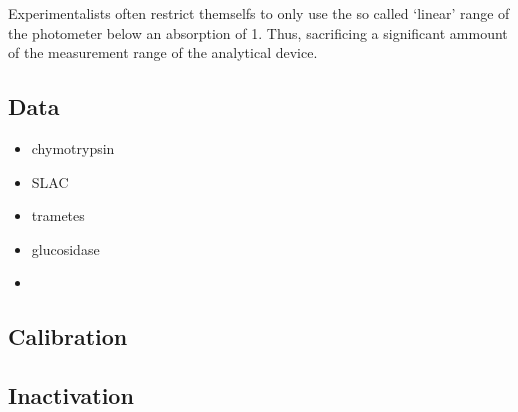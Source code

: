 \documentclass[letterpaper,10pt,english]{jupyterBook}
\begin{document}
\sphinxAtStartPar
Experimentalists often restrict themselfs to only use the so called ‘linear’ range of the photometer below an absorption of 1. Thus, sacrificing a significant ammount of the measurement range of the analytical device.


\subsection{Data}
\label{\detokenize{scenarios/effect_calibration_model:data}}\begin{itemize}
\item {} 
\sphinxAtStartPar
chymotrypsin

\item {} 
\sphinxAtStartPar
SLAC

\item {} 
\sphinxAtStartPar
trametes

\item {} 
\sphinxAtStartPar
glucosidase

\item {} 
\end{itemize}


\subsection{Calibration}
\label{\detokenize{scenarios/effect_calibration_model:calibration}}

\subsection{Inactivation}
\label{\detokenize{scenarios/effect_calibration_model:inactivation}}
\end{document}
